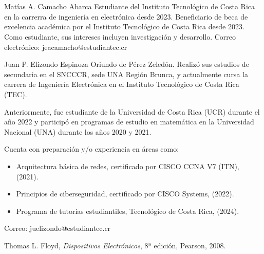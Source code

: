\documentclass[journal]{IEEEtran}
\begin{document}
\section{}
\vspace{-1.2cm}
\begin{IEEEbiographynophoto}{Matías A. Camacho Abarca}
        Estudiante del Instituto Tecnológico de Costa Rica en la carrerra de ingeniería en electrónica desde
        2023. Beneficiario de beca de excelencia académica por el Instituto Tecnológico de
        Costa Rica desde 2023. Como estudiante, sus
        intereses incluyen investigación y desarrollo.
        Correo electrónico: jeacamacho@estudiantec.cr
\end{IEEEbiographynophoto}
\vspace{-1.2cm}
\begin{IEEEbiographynophoto}{Juan P. Elizondo Espinoza}
        Oriundo de Pérez Zeledón. Realizó sus estudios de secundaria en el SNCCCR, sede UNA Región Brunca, y actualmente cursa la carrera de Ingeniería Electrónica en el Instituto Tecnológico de Costa Rica (TEC). 
        
        Anteriormente, fue estudiante de la Universidad de Costa Rica (UCR) durante el año 2022 y participó en programas de estudio en matemática en la Universidad Nacional (UNA) durante los años 2020 y 2021. 
        
        Cuenta con preparación y/o experiencia en áreas como:
        \begin{itemize}
            \item Arquitectura básica de redes, certificado por CISCO CCNA V7 (ITN), (2021).
            \item Principios de ciberseguridad, certificado por CISCO Systems, (2022).
            \item Programa de tutorías estudiantiles, Tecnológico de Costa Rica, (2024).
        \end{itemize}
        
        Correo: juelizondo@estudiantec.cr
\end{IEEEbiographynophoto}


\begin{thebibliography}{11}
    Thomas L. Floyd, \emph{Dispositivos Electrónicos}, 8ª edición, Pearson, 2008.
\end{thebibliography}
\end{document}
